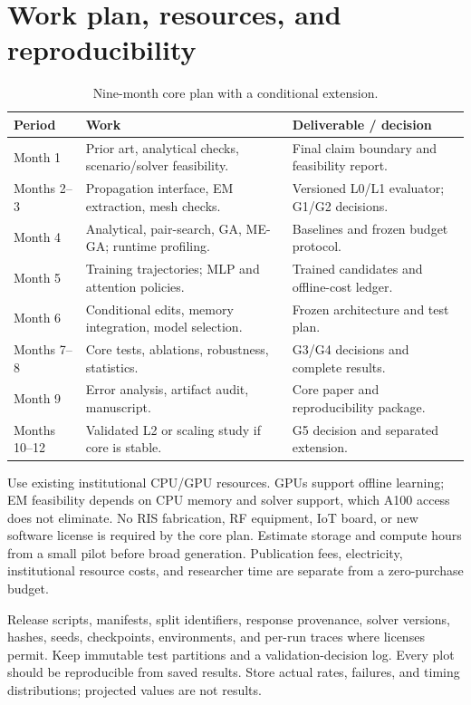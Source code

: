 \documentclass[conference]{IEEEtran}
\begin{document}
\section{Work plan, resources, and reproducibility}
\begin{table}[t]
\caption{Nine-month core plan with a conditional extension.}
\small
\begin{tabularx}{\linewidth}{@{}p{19mm}YY@{}}
\toprule
Period & Work & Deliverable / decision\\
\midrule
Month 1 & Prior art, analytical checks, scenario/solver feasibility. & Final claim boundary and feasibility report.\\
Months 2--3 & Propagation interface, EM extraction, mesh checks. & Versioned L0/L1 evaluator; G1/G2 decisions.\\
Month 4 & Analytical, pair-search, GA, ME-GA; runtime profiling. & Baselines and frozen budget protocol.\\
Month 5 & Training trajectories; MLP and attention policies. & Trained candidates and offline-cost ledger.\\
Month 6 & Conditional edits, memory integration, model selection. & Frozen architecture and test plan.\\
Months 7--8 & Core tests, ablations, robustness, statistics. & G3/G4 decisions and complete results.\\
Month 9 & Error analysis, artifact audit, manuscript. & Core paper and reproducibility package.\\
Months 10--12 & Validated L2 or scaling study if core is stable. & G5 decision and separated extension.\\
\bottomrule
\end{tabularx}
\end{table}

Use existing institutional CPU/GPU resources. GPUs support offline learning; EM feasibility depends on CPU memory and solver support, which A100 access does not eliminate. No RIS fabrication, RF equipment, IoT board, or new software license is required by the core plan. Estimate storage and compute hours from a small pilot before broad generation. Publication fees, electricity, institutional resource costs, and researcher time are separate from a zero-purchase budget.

Release scripts, manifests, split identifiers, response provenance, solver versions, hashes, seeds, checkpoints, environments, and per-run traces where licenses permit. Keep immutable test partitions and a validation-decision log. Every plot should be reproducible from saved results. Store actual rates, failures, and timing distributions; projected values are not results.
\end{document}
